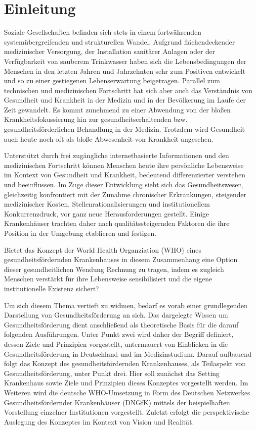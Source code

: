 \section{Einleitung}
\label{sec:Einleitung}

Soziale Gesellschaften befinden sich stets in einem fortwährenden systemübergreifenden
und strukturellen Wandel. Aufgrund flächendeckender medizinischer Versorgung, der Installation sanitärer Anlagen oder der Verfügbarkeit von sauberem Trinkwasser haben sich die Lebensbedingungen der Menschen in den letzten Jahren und Jahrzehnten sehr zum Positiven entwickelt und so zu einer gestiegenen Lebenserwartung beigetragen. Parallel zum technischen und medizinischen Fortschritt hat sich aber auch das Verständnis von Gesundheit und Krankheit in der Medizin und in der Bevölkerung im Laufe der Zeit gewandelt. Es kommt zunehmend zu einer Abwendung von der bloßen Krankheitsfokussierung hin zur gesundheitserhaltenden bzw. gesundheitsförderlichen Behandlung in der Medizin. Trotzdem wird Gesundheit auch heute noch oft als bloße Abwesenheit von Krankheit angesehen.

Unterstützt durch frei zugängliche internetbasierte Informationen und den medizinischen Fortschritt können Menschen heute ihre persönliche Lebensweise im Kontext von Gesundheit und Krankheit, bedeutend differenzierter verstehen und beeinflussen. Im Zuge dieser Entwicklung sieht sich das Gesundheitswesen, gleichzeitig konfrontiert mit der Zunahme chronischer Erkrankungen, steigender medizinischer Kosten, Stellenrationalisierungen und institutionellem Konkurrenzdruck, vor ganz neue Herausforderungen gestellt. Einige Krankenhäuser trachten daher nach qualitätssteigernden Faktoren die ihre Position in der Umgebung etablieren und festigen. 

Bietet das Konzept der World Health Organziation (WHO) eines gesundheitsfördernden Krankenhauses in diesem Zusammenhang eine Option dieser gesundheitlichen Wendung Rechnung zu tragen, indem es zugleich Menschen verstärkt für ihre Lebensweise sensibilisiert und die eigene institutionelle Existenz sichert?

Um sich diesem Thema vertieft zu widmen, bedarf es vorab einer grundlegenden Darstellung von Gesundheitsförderung an sich. Das dargelegte Wissen um Gesundheitsförderung dient anschließend als theoretische Basis für die darauf folgenden Ausführungen. Unter Punkt zwei wird daher der Begriff definiert, dessen Ziele und Prinzipien vorgestellt, untermauert von Einblicken in die Gesundheitsförderung in Deutschland und im Medizinstudium. Darauf aufbauend folgt das Konzept des gesundheitsfördernden Krankenhauses, als Teilaspekt von Gesundheitsförderung, unter Punkt drei. Hier soll zunächst das Setting Krankenhaus sowie Ziele und Prinzipien dieses Konzeptes vorgestellt werden. Im Weiteren wird die deutsche WHO-Umsetzung in Form des Deutschen Netzwerkes Gesundheitsfördernder Krankenhäuser (DNGfK) mittels der beispielhaften Vorstellung einzelner Institutionen vorgestellt. Zuletzt erfolgt die perspektivische Auslegung des Konzeptes im Kontext von Vision und Realität. 

